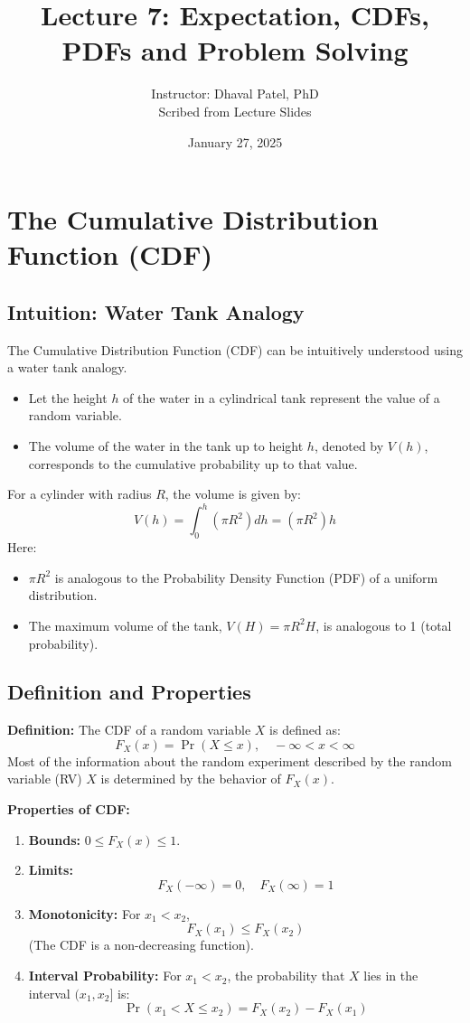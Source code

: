 \documentclass[11pt]{article}
\title{\textbf{Lecture 7: Expectation, CDFs, PDFs and Problem Solving}}
\author{Instructor: Dhaval Patel, PhD \\ Scribed from Lecture Slides}
\date{January 27, 2025}
\begin{document}
\maketitle

\section{The Cumulative Distribution Function (CDF)}

\subsection{Intuition: Water Tank Analogy}
The Cumulative Distribution Function (CDF) can be intuitively understood using a water tank analogy.
\begin{itemize}
    \item Let the height $h$ of the water in a cylindrical tank represent the value of a random variable.
    \item The volume of the water in the tank up to height $h$, denoted by $V(h)$, corresponds to the cumulative probability up to that value.
\end{itemize}
For a cylinder with radius $R$, the volume is given by:
$$ V(h) = \int_{0}^{h} (\pi R^{2}) dh = (\pi R^{2})h $$
Here:
\begin{itemize}
    \item $\pi R^{2}$ is analogous to the Probability Density Function (PDF) of a uniform distribution.
    \item The maximum volume of the tank, $V(H) = \pi R^{2}H$, is analogous to 1 (total probability).
\end{itemize}

\subsection{Definition and Properties}
\textbf{Definition:} The CDF of a random variable $X$ is defined as:
$$ F_{X}(x) = \Pr(X \le x), \quad -\infty < x < \infty $$
Most of the information about the random experiment described by the random variable (RV) $X$ is determined by the behavior of $F_{X}(x)$.

\textbf{Properties of CDF:}
\begin{enumerate}
    \item \textbf{Bounds:} $0 \le F_{X}(x) \le 1$.
    \item \textbf{Limits:}
    $$ F_{X}(-\infty) = 0, \quad F_{X}(\infty) = 1 $$
    \item \textbf{Monotonicity:} For $x_{1} < x_{2}$,
    $$ F_{X}(x_{1}) \le F_{X}(x_{2}) $$
    (The CDF is a non-decreasing function).
    \item \textbf{Interval Probability:} For $x_{1} < x_{2}$, the probability that $X$ lies in the interval $(x_1, x_2]$ is:
    $$ \Pr(x_{1} < X \le x_{2}) = F_{X}(x_{2}) - F_{X}(x_{1}) $$
\end{enumerate}
\end{document}
